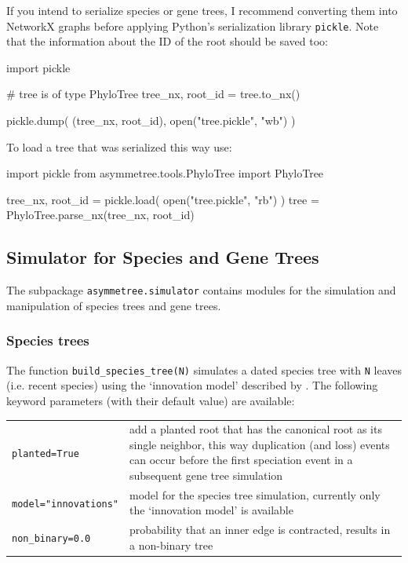 \documentclass[hidelinks,11pt]{scrreprt}
\begin{document}
If you intend to serialize species or gene trees, I recommend converting them into NetworkX graphs before applying Python's serialization library \texttt{pickle}.
Note that the information about the ID of the root should be saved too:
\vspace{2mm}
\begin{python}
import pickle

# tree is of type PhyloTree
tree_nx, root_id = tree.to_nx()

pickle.dump( (tree_nx, root_id), open("tree.pickle", "wb") )
\end{python}
\vspace{2mm}
To load a tree that was serialized this way use:
\vspace{2mm}
\begin{python}
import pickle
from asymmetree.tools.PhyloTree import PhyloTree

tree_nx, root_id = pickle.load( open("tree.pickle", "rb") )
tree = PhyloTree.parse_nx(tree_nx, root_id)
\end{python}
\vspace{2mm}


\subsection{Simulator for Species and Gene Trees}

The subpackage \texttt{asymmetree.simulator} contains modules for the simulation and manipulation of species trees and gene trees.

\subsubsection{Species trees}

The function \texttt{build\_species\_tree(N)} simulates a dated species tree with \texttt{N} leaves (i.e. recent species) using the `innovation model' described by \citet{keller-schmidt2012}.
The following keyword parameters (with their default value) are available:

\vspace{3mm}
\renewcommand{\arraystretch}{1.5}
\begin{tabularx}{0.95\textwidth} { >{\raggedright\arraybackslash}p{4cm} >{\raggedright\arraybackslash}X }
	\texttt{planted=True} & add a planted root that has the canonical root as its
	single neighbor, this way duplication (and loss) events can occur before the first speciation event in a subsequent gene tree simulation\\
	\texttt{model="innovations"}  & model for the species tree simulation, currently only the `innovation model' is available\\
	\texttt{non\_binary=0.0} & probability that an inner edge is contracted,
	results in a non-binary tree\\
\end{tabularx}
\vspace{3mm}
\end{document}
